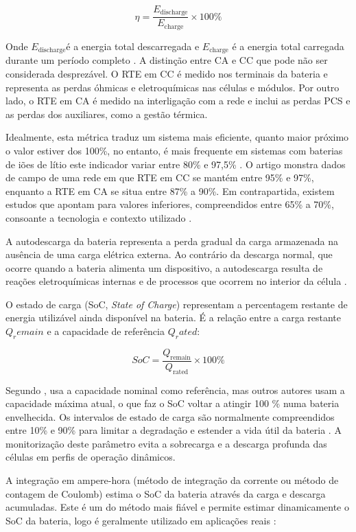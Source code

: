 \[
\eta = \frac{E_{\text{discharge}}}{E_{\text{charge}}} \times 100\%
\]

Onde $E_{\text{discharge}}$é a energia total descarregada e $E_{\text{charge}}$ é a energia total carregada durante um período completo \cite{ Kyeremeh2026}. A distinção entre CA e CC que pode não ser considerada desprezável. O RTE em CC é medido nos terminais da bateria e representa as perdas óhmicas e eletroquímicas nas células e módulos. Por outro lado, o RTE em CA é medido na interligação com a rede e inclui as perdas PCS e as perdas dos auxiliares, como a gestão térmica. 

Idealmente, esta métrica traduz um sistema mais eficiente, quanto maior próximo o valor estiver dos 100\%, no entanto, é mais frequente em sistemas com baterias de iões de lítio este indicador variar entre 80\% e 97,5\% \cite{ Lin2023}. O artigo \cite{ Kyeremeh2026} monstra dados de campo de uma rede em que RTE em CC se mantém entre 95\% e 97\%, enquanto a RTE em CA se situa entre 87\% a 90\%. Em contrapartida, existem estudos que apontam para valores inferiores, compreendidos entre 65\% a 70\%, consoante a tecnologia e contexto utilizado \cite{ Safarzadeh2026}\cite{ Kyeremeh2026}.

A autodescarga da bateria representa a perda gradual da carga armazenada na ausência de uma carga elétrica externa. Ao contrário da descarga normal, que ocorre quando a bateria alimenta um dispositivo, a autodescarga resulta de reações eletroquímicas internas e de processos que ocorrem no interior da célula \cite{ BetterTechnologyGroupLimited2026}.


O estado de carga (SoC, \textit{State of Charge}) representam a percentagem restante de energia utilizável ainda disponível na bateria. É a relação entre a carga restante $Q_remain$ e a capacidade de referência $Q_rated$:


\[
SoC = \frac{Q_{\text{remain}}}{Q_{\text{rated}}} \times 100\%
\]

Segundo \textcite{ Zhao2023}, usa a capacidade nominal como referência, mas outros autores usam a capacidade máxima atual, o que faz o SoC voltar a atingir 100 \% numa bateria envelhecida. Os intervalos de estado de carga são normalmente compreendidos entre 10\% e 90\% para limitar a degradação e estender a vida útil da bateria \cite{ Safarzadeh2026}. A monitorização deste parâmetro evita a sobrecarga e a descarga profunda das células em perfis de operação dinâmicos.

A integração em ampere-hora (método de integração da corrente ou método de contagem de Coulomb) estima o SoC da bateria através da carga e descarga acumuladas. Este é um do método mais fiável e permite estimar dinamicamente o SoC da bateria, logo é geralmente utilizado em aplicações reais \cite{ Zhao2023}:



